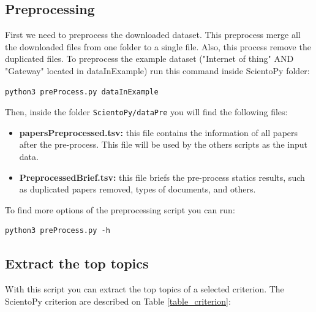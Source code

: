 \documentclass[10pt,letterpaper]{article}
\begin{document}
\subsection{Preprocessing}

First we need to preprocess the downloaded dataset. This preprocess merge all the downloaded files from one folder to a single file. Also, this process remove the duplicated files. To preprocess the example dataset ("Internet of thing"  AND  "Gateway" located in dataInExample) run this command inside ScientoPy folder: 
\begin{verbatim}
python3 preProcess.py dataInExample
\end{verbatim}

Then, inside the folder \verb|ScientoPy/dataPre| you will find the following files: 
\begin{itemize}
\item \textbf{papersPreprocessed.tsv:} this file contains the information of all papers after the pre-process. This file will be used by the others scripts as the input data. 
\item \textbf{PreprocessedBrief.tsv:} this file briefs the pre-process statics results, such as duplicated papers removed, types of documents, and others. 
\end{itemize}

To find more options of the preprocessing script you can run:
\begin{verbatim}
python3 preProcess.py -h
\end{verbatim}

\subsection{Extract the top topics}

With this script you can extract the top topics of a selected criterion. The ScientoPy criterion are described on Table \ref{table_criterion}:
\end{document}
